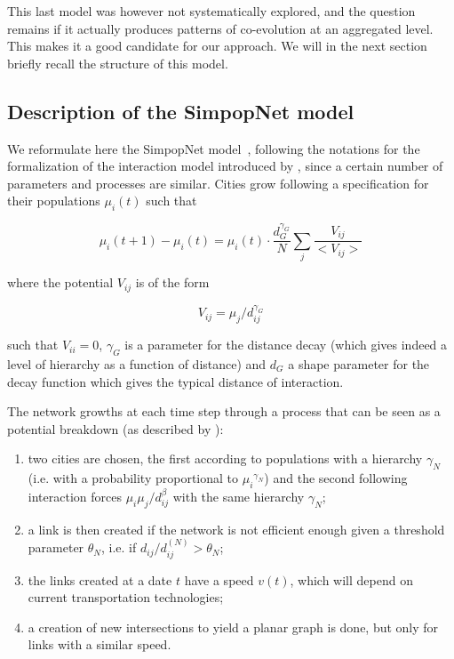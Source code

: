 This last model was however not systematically explored, and the question remains if it actually produces patterns of co-evolution at an aggregated level. This makes it a good candidate for our approach. We will in the next section briefly recall the structure of this model.



\subsection{Description of the SimpopNet model}


We reformulate here the SimpopNet model~\cite{schmitt2014modelisation}, following the notations for the formalization of the interaction model introduced by \cite{raimbault2018indirect}, since a certain number of parameters and processes are similar. Cities grow following a specification for their populations $\mu_i(t)$ such that

\begin{equation}
\mu_i(t+1) - \mu_i (t) = \mu_i (t) \cdot \frac{d_G^{\gamma_G}}{N} \sum_{j} \frac{V_{ij}}{<V_{ij}>}
\end{equation}

where the potential $V_{ij}$ is of the form 

\begin{equation}
V_{ij} = \mu_j / d_{ij}^{\gamma_G}
\end{equation}

such that $V_{ii}=0$, $\gamma_G$ is a parameter for the distance decay (which gives indeed a level of hierarchy as a function of distance) and $d_G$ a shape parameter for the decay function which gives the typical distance of interaction.


The network growths at each time step through a process that can be seen as a potential breakdown (as described by \cite{raimbault:tel-01857741}):
\begin{enumerate}
	\item two cities are chosen, the first according to populations with a hierarchy $\gamma_N$ (i.e. with a probability proportional to ${\mu_i}^{\gamma_N}$) and the second following interaction forces $\mu_i \mu_j / d_{ij}^\beta$ with the same hierarchy $\gamma_N$;
	\item a link is then created if the network is not efficient enough given a threshold parameter $\theta_N$, i.e. if $d_{ij}/d^{(N)}_{ij}> \theta_N$;
	\item the links created at a date $t$ have a speed $v(t)$, which will depend on current transportation technologies;
	\item a creation of new intersections to yield a planar graph is done, but only for links with a similar speed.
\end{enumerate}

